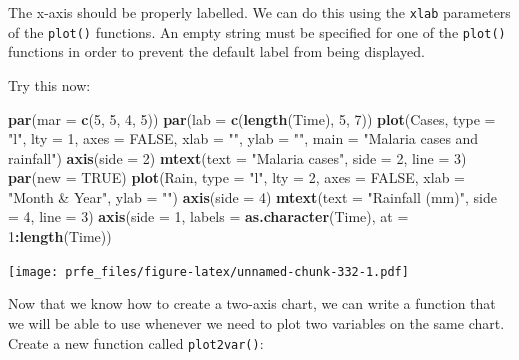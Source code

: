 \documentclass[12pt,]{book}
\newenvironment{Shaded}{\begin{snugshade}}{\end{snugshade}}
\newcommand{\KeywordTok}[1]{\textcolor[rgb]{0.13,0.29,0.53}{\textbf{#1}}}
\newcommand{\DataTypeTok}[1]{\textcolor[rgb]{0.13,0.29,0.53}{#1}}
\newcommand{\DecValTok}[1]{\textcolor[rgb]{0.00,0.00,0.81}{#1}}
\newcommand{\StringTok}[1]{\textcolor[rgb]{0.31,0.60,0.02}{#1}}
\newcommand{\OtherTok}[1]{\textcolor[rgb]{0.56,0.35,0.01}{#1}}
\newcommand{\OperatorTok}[1]{\textcolor[rgb]{0.81,0.36,0.00}{\textbf{#1}}}
\newcommand{\NormalTok}[1]{#1}
\theoremstyle{definition}
\theoremstyle{definition}
\theoremstyle{definition}
\theoremstyle{remark}
\begin{document}
The x-axis should be properly labelled. We can do this using the
\texttt{xlab} parameters of the \texttt{plot()} functions. An empty
string must be specified for one of the \texttt{plot()} functions in
order to prevent the default label from being displayed.

Try this now:

\begin{Shaded}
\begin{Highlighting}[]
\KeywordTok{par}\NormalTok{(}\DataTypeTok{mar =} \KeywordTok{c}\NormalTok{(}\DecValTok{5}\NormalTok{, }\DecValTok{5}\NormalTok{, }\DecValTok{4}\NormalTok{, }\DecValTok{5}\NormalTok{))}
\KeywordTok{par}\NormalTok{(}\DataTypeTok{lab =} \KeywordTok{c}\NormalTok{(}\KeywordTok{length}\NormalTok{(Time), }\DecValTok{5}\NormalTok{, }\DecValTok{7}\NormalTok{))}
\KeywordTok{plot}\NormalTok{(Cases, }\DataTypeTok{type =} \StringTok{"l"}\NormalTok{, }\DataTypeTok{lty =} \DecValTok{1}\NormalTok{, }\DataTypeTok{axes =} \OtherTok{FALSE}\NormalTok{,}
     \DataTypeTok{xlab =} \StringTok{""}\NormalTok{, }\DataTypeTok{ylab =} \StringTok{""}\NormalTok{, }\DataTypeTok{main =} \StringTok{"Malaria cases and rainfall"}\NormalTok{)}
\KeywordTok{axis}\NormalTok{(}\DataTypeTok{side =} \DecValTok{2}\NormalTok{)}
\KeywordTok{mtext}\NormalTok{(}\DataTypeTok{text =} \StringTok{"Malaria cases"}\NormalTok{, }\DataTypeTok{side =} \DecValTok{2}\NormalTok{, }\DataTypeTok{line =} \DecValTok{3}\NormalTok{)}
\KeywordTok{par}\NormalTok{(}\DataTypeTok{new =} \OtherTok{TRUE}\NormalTok{)}
\KeywordTok{plot}\NormalTok{(Rain, }\DataTypeTok{type =} \StringTok{"l"}\NormalTok{, }\DataTypeTok{lty =} \DecValTok{2}\NormalTok{, }\DataTypeTok{axes =} \OtherTok{FALSE}\NormalTok{,}
     \DataTypeTok{xlab =} \StringTok{"Month & Year"}\NormalTok{, }\DataTypeTok{ylab =} \StringTok{""}\NormalTok{)}
\KeywordTok{axis}\NormalTok{(}\DataTypeTok{side =} \DecValTok{4}\NormalTok{)}
\KeywordTok{mtext}\NormalTok{(}\DataTypeTok{text =} \StringTok{"Rainfall (mm)"}\NormalTok{, }\DataTypeTok{side =} \DecValTok{4}\NormalTok{, }\DataTypeTok{line =} \DecValTok{3}\NormalTok{)}
\KeywordTok{axis}\NormalTok{(}\DataTypeTok{side =} \DecValTok{1}\NormalTok{, }\DataTypeTok{labels =} \KeywordTok{as.character}\NormalTok{(Time), }\DataTypeTok{at =} \DecValTok{1}\OperatorTok{:}\KeywordTok{length}\NormalTok{(Time))}
\end{Highlighting}
\end{Shaded}

\texttt{[image: prfe\_files/figure-latex/unnamed-chunk-332-1.pdf]}

Now that we know how to create a two-axis chart, we can write a function
that we will be able to use whenever we need to plot two variables on
the same chart. Create a new function called \texttt{plot2var()}:
\end{document}
